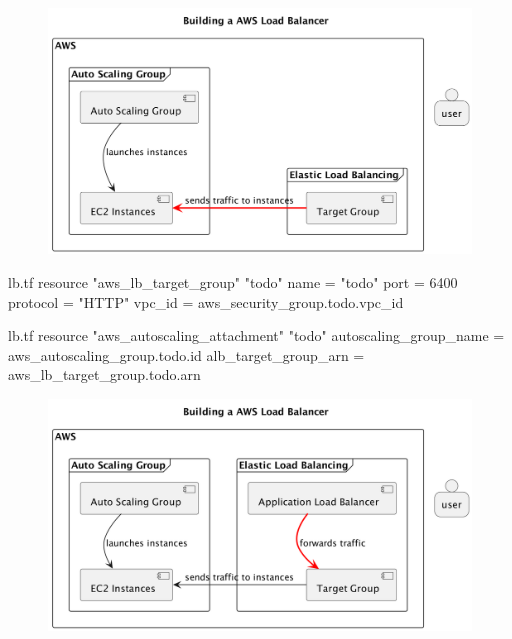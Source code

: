 \documentclass{csse4400}
\begin{document}


\begin{figure}[H]
  \includegraphics[width=\textwidth]{diagrams/lb2}
\end{figure}

\begin{code}[language=terraform,numbers=none]{lb.tf}
resource "aws_lb_target_group" "todo" {
  name     = "todo"
  port     = 6400
  protocol = "HTTP"
  vpc_id   = aws_security_group.todo.vpc_id
}
\end{code}


\begin{code}[language=terraform,numbers=none]{lb.tf}
resource "aws_autoscaling_attachment" "todo" {
  autoscaling_group_name = aws_autoscaling_group.todo.id
  alb_target_group_arn   = aws_lb_target_group.todo.arn
}
\end{code}


\begin{figure}[H]
  \includegraphics[width=\textwidth]{diagrams/lb3}
\end{figure}
\end{document}

